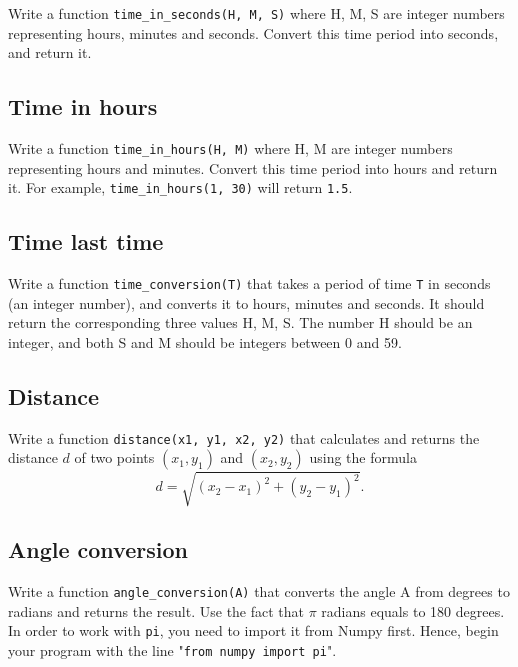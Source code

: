 Write a function {\tt time\_in\_seconds(H, M, S)} where H, M, S are
integer numbers representing hours, minutes and seconds. Convert this 
time period into seconds, and return it. 


\subsection{Time in hours}

Write a function {\tt time\_in\_hours(H, M)} where H, M are
integer numbers representing hours and minutes. Convert this 
time period into hours and return it. For example, {\tt time\_in\_hours(1, 30)}
will return {\tt 1.5}.


\subsection{Time last time}

Write a function {\tt time\_conversion(T)} that takes 
a period of time {\tt T} in seconds (an integer number), and converts it to 
hours, minutes and seconds. It should return the corresponding 
three values H, M, S. The number H should be an integer, and both S 
and M should be integers between 0 and 59.


\subsection{Distance}

Write a function {\tt distance(x1, y1, x2, y2)} that calculates and 
returns the distance $d$ of two points $(x_1, y_1)$ and $(x_2, y_2)$
using the formula 
$$
d = \sqrt{(x_2 - x_1)^2 + (y_2 - y_1)^2}.
$$ 


\subsection{Angle conversion}

Write a function {\tt angle\_conversion(A)} that converts the angle A
from degrees to radians and returns the result. Use the fact that $\pi$
radians equals to 180 degrees. In order to work with {\tt pi}, you need to 
import it from Numpy first. Hence, begin your program with the line 
"{\tt from numpy import pi}".

